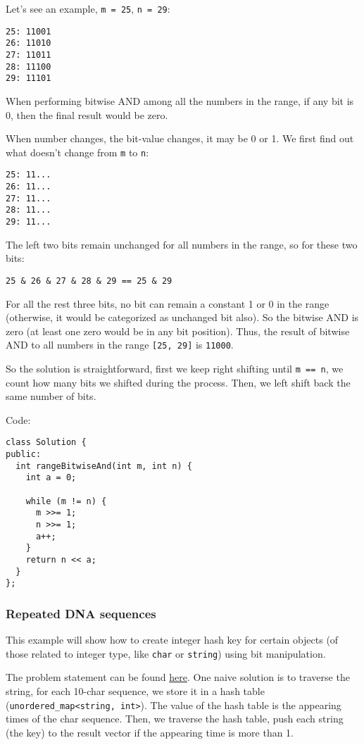 \documentclass[12pt]{article}
\begin{document}
Let's see an example, \texttt{m = 25}, \texttt{n = 29}:
\begin{verbatim}
25: 11001
26: 11010
27: 11011
28: 11100
29: 11101
\end{verbatim}
When performing bitwise AND among all the numbers in the range, if any bit is 0, then the final result would be zero.

When number changes, the bit-value changes, it may be 0 or 1. We first find out what doesn't change from \texttt{m} to \texttt{n}:
\begin{verbatim}
25: 11...
26: 11...
27: 11...
28: 11...
29: 11...
\end{verbatim}
The left two bits remain unchanged for all numbers in the range, so for these two bits:
\begin{verbatim}
25 & 26 & 27 & 28 & 29 == 25 & 29
\end{verbatim}
For all the rest three bits, no bit can remain a constant 1 or 0 in the range (otherwise, it would be categorized as unchanged bit also). So the bitwise AND is zero (at least one zero would be in any bit position). Thus, the result of bitwise AND to all numbers in the range \texttt{[25, 29]} is \texttt{11000}.

So the solution is straightforward, first we keep right shifting until \texttt{m == n}, we count how many bits we shifted during the process. Then, we left shift back the same number of bits.

Code:
\begin{verbatim}
class Solution {
public:
  int rangeBitwiseAnd(int m, int n) {
    int a = 0;

    while (m != n) {
      m >>= 1;
      n >>= 1;
      a++;
    }
    return n << a;
  }
};
\end{verbatim}

\subsubsection{Repeated DNA sequences}
\label{sec:org0949f2a}
This example will show how to create integer hash key for certain objects (of those related to integer type, like \texttt{char} or \texttt{string}) using bit manipulation.

The problem statement can be found \href{https://leetcode.com/problems/repeated-dna-sequences/}{here}. One naive solution is to traverse the string, for each 10-char sequence, we store it in a hash table (\texttt{unordered\_map<string, int>}). The value of the hash table is the appearing times of the char sequence. Then, we traverse the hash table, push each string (the key) to the result vector if the appearing time is more than 1.
\end{document}
